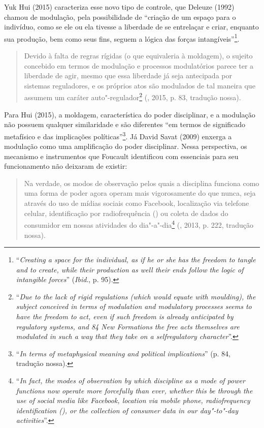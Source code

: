 Yuk Hui (2015) caracteriza esse novo tipo de controle, que Deleuze
(1992) chamou de modulação, pela possibilidade de ``criação de um espaço
para o indivíduo, como se ele ou ela tivesse a liberdade de se
entrelaçar e criar, enquanto sua produção, bem como seus fins, seguem a
lógica das forças intangíveis''\footnote{``\emph{Creating a space for the
  individual, as if he or she has the freedom to tangle and to create,
  while their production as well their ends follow the logic of
  intangible forces}'' (\emph{Ibid}., p. 95).}.

\begin{quote}
Devido à falta de regras rígidas (o que equivaleria à moldagem), o
sujeito concebido em termos de modulação e processos modulatórios parece
ter a liberdade de agir, mesmo que essa liberdade já seja antecipada por
sistemas reguladores, e os próprios atos são modulados de tal maneira
que assumem um caráter auto"-regulador\footnote{``\emph{Due to the lack of
  rigid regulations (which would equate with moulding), the subject
  conceived in terms of modulation and modulatory processes seems to
  have the freedom to act, even if such freedom is already anticipated
  by regulatory systems, and 84 New Formations the free acts themselves
  are modulated in such a way that they take on a selfregulatory
  character}''.}
 (, 2015, p. 83, tradução nossa).
\end{quote}

Para Hui (2015), a moldagem, característica do poder disciplinar, e a modulação não
possuem qualquer similaridade e são diferentes ``em termos de
significado metafísico e das implicações políticas''\footnote{``\emph{In terms
  of metaphysical meaning and political implications}'' (p. 84, tradução
nossa).}. Já David Savat (2009) enxerga a modulação como uma amplificação do poder disciplinar. Nessa perspectiva, os mecanismo e instrumentos que Foucault identificou com
essenciais para seu funcionamento não deixaram de existir:

\begin{quote}
Na verdade, os modos de observação pelos quais a disciplina funciona
como uma forma de poder agora operam mais vigorosamente do que nunca,
seja através do uso de mídias sociais como Facebook, localização  via
telefone celular, identificação por radiofrequência () ou coleta de
dados do consumidor em nossas atividades do dia"-a"-dia\footnote{``\emph{In
  fact, the modes of observation by which discipline as a mode of power
  functions now operate more forcefully than ever, whether this be
  through the use of social media like Facebook,  location via mobile
  phone, radiofrequency identification (), or the collection of
  consumer data in our day"-to"-day activities}''.} (, 2013, p. 222, tradução nossa). 
\end{quote}

